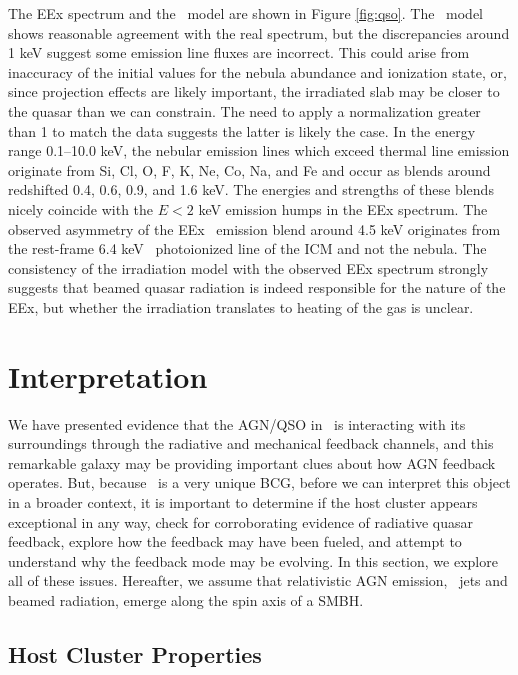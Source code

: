 \documentclass[useAMS,usenatbib]{mn2e}
\begin{document}
The EEx spectrum and the \cloudy\ model are shown in Figure
\ref{fig:qso}. The \cloudy\ model shows reasonable agreement with the
real spectrum, but the discrepancies around 1 keV suggest some
emission line fluxes are incorrect. This could arise from inaccuracy
of the initial values for the nebula abundance and ionization state,
or, since projection effects are likely important, the irradiated slab
may be closer to the quasar than we can constrain. The need to apply a
normalization greater than 1 to match the data suggests the latter is
likely the case. In the energy range 0.1--10.0 keV, the nebular
emission lines which exceed thermal line emission originate from Si,
Cl, O, F, K, Ne, Co, Na, and Fe and occur as blends around redshifted
0.4, 0.6, 0.9, and 1.6 keV. The energies and strengths of these blends
nicely coincide with the $E < 2$ keV emission humps in the EEx
spectrum. The observed asymmetry of the EEx \feka\ emission blend
around 4.5 keV originates from the rest-frame 6.4 keV
\feka\ photoionized line of the ICM and not the nebula. The
consistency of the irradiation model with the observed EEx spectrum
strongly suggests that beamed quasar radiation is indeed responsible
for the nature of the EEx, but whether the irradiation translates to
heating of the gas is unclear.

\section{Interpretation}
\label{sec:interp}

We have presented evidence that the AGN/QSO in \irs\ is interacting
with its surroundings through the radiative and mechanical feedback
channels, and this remarkable galaxy may be providing important clues
about how AGN feedback operates. But, because \irs\ is a very unique
BCG, before we can interpret this object in a broader context, it is
important to determine if the host cluster appears exceptional in any
way, check for corroborating evidence of radiative quasar feedback,
explore how the feedback may have been fueled, and attempt to
understand why the feedback mode may be evolving. In this section, we
explore all of these issues. Hereafter, we assume that relativistic
AGN emission, \eg\ jets and beamed radiation, emerge along the spin
axis of a SMBH.

\subsection{Host Cluster Properties}
\end{document}
